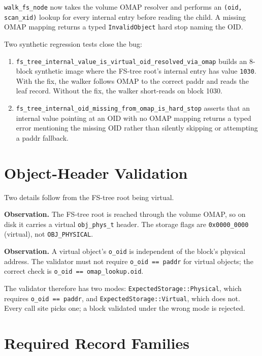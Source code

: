 \texttt{walk\_fs\_node} now takes the volume OMAP resolver and
performs an \texttt{(oid, scan\_xid)} lookup for every internal
entry before reading the child. A missing OMAP mapping returns a
typed \texttt{InvalidObject} hard stop naming the OID.

Two synthetic regression tests close the bug:

\begin{enumerate}
  \item \texttt{fs\_tree\_internal\_value\_is\_virtual\_oid\_resolved\_via\_omap}
    builds an 8-block synthetic image where the FS-tree root's
    internal entry has value \texttt{1030}. With the fix, the walker
    follows OMAP to the correct paddr and reads the leaf record.
    Without the fix, the walker short-reads on block 1030.
  \item \texttt{fs\_tree\_internal\_oid\_missing\_from\_omap\_is\_hard\_stop}
    asserts that an internal value pointing at an OID with no OMAP
    mapping returns a typed error mentioning the missing OID rather
    than silently skipping or attempting a paddr fallback.
\end{enumerate}

\section{Object-Header Validation}

Two details follow from the FS-tree root being virtual.

\textbf{Observation.} The FS-tree root is reached through the volume
OMAP, so on disk it carries a virtual \texttt{obj\_phys\_t} header.
The storage flags are \texttt{0x0000\_0000} (virtual), not
\texttt{OBJ\_PHYSICAL}.

\textbf{Observation.} A virtual object's \texttt{o\_oid} is
independent of the block's physical address. The validator must
not require \texttt{o\_oid == paddr} for virtual objects; the
correct check is \texttt{o\_oid == omap\_lookup.oid}.

The validator therefore has two modes:
\texttt{ExpectedStorage::Physical}, which requires
\texttt{o\_oid == paddr}, and \texttt{ExpectedStorage::Virtual},
which does not. Every call site picks one; a block validated under
the wrong mode is rejected.

\section{Required Record Families}

